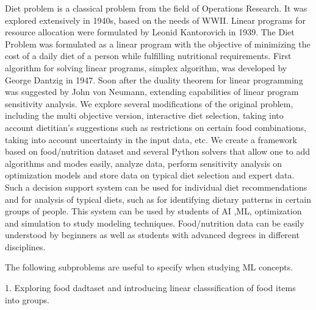 Diet problem is a classical problem from the field of Operations Research.  It was explored extensively in 1940s, based on the needs of WWII. Linear programs for resource allocation were formulated by Leonid Kantorovich in 1939. The Diet Problem was formulated as a linear program with the objective of minimizing the cost of a daily diet of a person while fulfilling nutritional requirements. First algorithm for solving linear programs, simplex algorithm, was developed by George Dantzig in 1947. Soon after the duality theorem for linear programming was suggested by John von Neumann, extending capabilities of linear program sensitivity analysis. 
We explore several modifications of the original problem, including the multi objective version, interactive diet selection, taking into account dietitian’s suggestions such as restrictions on certain food combinations, taking into account uncertainty in the input data, etc. We create a framework based on food/nutrition dataset and several Python solvers that allow one to add algorithms and modes easily, analyze data, perform sensitivity analysis on optimization models and store data on typical diet selection and expert data. Such a decision support system can be used for individual diet recommendations and for analysis of typical diets, such as for identifying dietary patterns in certain groups of people. This system can be used by students of AI ,ML,  optimization and simulation to study modeling techniques. Food/nutrition data can be easily understood by beginners as well as students with advanced degrees in different disciplines.  


The following subproblems are useful to specify when studying ML concepts. 

1. Exploring food dadtaset and introducing linear classsification of food items into groups. 

